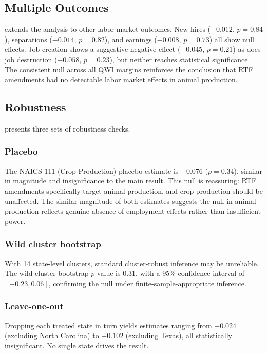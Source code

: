 \documentclass[12pt]{article}
\begin{document}


\subsection{Multiple Outcomes}

 extends the analysis to other labor market outcomes. New hires ($-0.012$, $p = 0.84$), separations ($-0.014$, $p = 0.82$), and earnings ($-0.008$, $p = 0.73$) all show null effects. Job creation shows a suggestive negative effect ($-0.045$, $p = 0.21$) as does job destruction ($-0.058$, $p = 0.23$), but neither reaches statistical significance. The consistent null across all QWI margins reinforces the conclusion that RTF amendments had no detectable labor market effects in animal production.



\subsection{Robustness}

 presents three sets of robustness checks.

\subsubsection*{Placebo} The NAICS 111 (Crop Production) placebo estimate is $-0.076$ ($p = 0.34$), similar in magnitude and insignificance to the main result. This null is reassuring: RTF amendments specifically target animal production, and crop production should be unaffected. The similar magnitude of both estimates suggests the null in animal production reflects genuine absence of employment effects rather than insufficient power.

\subsubsection*{Wild cluster bootstrap} With 14 state-level clusters, standard cluster-robust inference may be unreliable. The wild cluster bootstrap $p$-value is 0.31, with a 95\% confidence interval of $[-0.23, 0.06]$, confirming the null under finite-sample-appropriate inference.

\subsubsection*{Leave-one-out} Dropping each treated state in turn yields estimates ranging from $-0.024$ (excluding North Carolina) to $-0.102$ (excluding Texas), all statistically insignificant. No single state drives the result.
\end{document}
